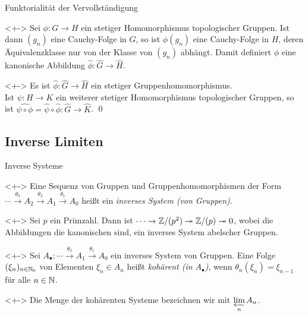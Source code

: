 \begin{frame}{Funktorialität der Vervollständigung}
	\begin{visibleenv}<+->
		Sei \(\phi\colon G \to H\) ein stetiger Homomorphismus topologischer Gruppen.
		Ist dann \((g_n)\) eine Cauchy-Folge in \(G\), so ist \(\phi(g_n)\) eine
		Cauchy-Folge in \(H\), deren Äquivalenzklasse nur von der Klasse von \((g_n)\)
		abhängt. Damit definiert \(\phi\) eine kanonische Abbildung
		\(\hat \phi\colon \hat G \to \hat H\).
	\end{visibleenv}
	\begin{proposition}<+->
		Es ist \(\hat\phi\colon \hat G \to \hat H\) ein stetiger Gruppenhomomorphismus.
		\\
		Ist \(\psi\colon H \to K\) ein weiterer stetiger Homomorphismus topologischer
		Gruppen, so ist \(\widehat{\psi \circ \phi} = \hat \psi \circ \hat\phi\colon \hat G \to \hat K\).
		\qed
	\end{proposition}
\end{frame}

\subsection{Inverse Limiten}

\begin{frame}{Inverse Systeme}
	\begin{definition}<+->
		Eine Sequenz von Gruppen und Gruppenhomomorphismen der Form
		\(\dotsb \xrightarrow{\theta_3} A_2 \xrightarrow{\theta_2} A_1 \xrightarrow{\theta_1} A_0\)
		heißt ein \emph{inverses System (von Gruppen)}.
	\end{definition}
	\begin{example}<+->
		Sei \(p\) ein Primzahl. Dann ist
		\(\dotsb \to \mathbb Z/(p^2) \twoheadrightarrow \mathbb Z/(p) \twoheadrightarrow 0\), wobei die Abbildungen die
		kanonischen sind, ein inverses System abelscher Gruppen.
	\end{example}
	\begin{definition}<+->
		Sei \(A_\bullet\colon \dotsb \xrightarrow{\theta_2} A_1 \xrightarrow{\theta_1} A_0\) ein inverses
		System von Gruppen. Eine Folge \((\xi_n)_{n \in \mathbb N_0}\) von Elementen \(\xi_n \in A_n\)
		heißt \emph{kohärent (in \(A_\bullet\))}, wenn \(\theta_n(\xi_n) = \xi_{n - 1}\) für alle \(n \in \mathbb N\).
	\end{definition}
	\begin{visibleenv}<+->
		Die Menge der kohärenten Systeme bezeichnen wir mit \(\varprojlim\limits_n A_n\).
	\end{visibleenv}
\end{frame}

